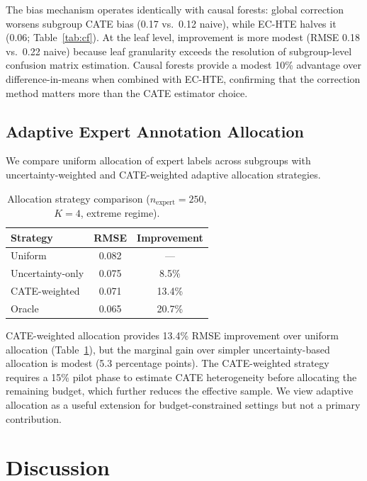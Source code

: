 \documentclass[11pt,a4paper]{article}
\begin{document}
The bias mechanism operates identically with causal forests: global correction worsens subgroup CATE bias (0.17 vs.\ 0.12 naive), while EC-HTE halves it (0.06; Table~\ref{tab:cf}).
At the leaf level, improvement is more modest (RMSE 0.18 vs.\ 0.22 naive) because leaf granularity exceeds the resolution of subgroup-level confusion matrix estimation.
Causal forests provide a modest 10\% advantage over difference-in-means when combined with EC-HTE, confirming that the correction method matters more than the CATE estimator choice.

\subsection{Adaptive Expert Annotation Allocation}
\label{sec:adaptive}

We compare uniform allocation of expert labels across subgroups with uncertainty-weighted and CATE-weighted adaptive allocation strategies.

\begin{table}[t]
\centering
\small
\caption{Allocation strategy comparison ($n_{\text{expert}}=250$, $K=4$, extreme regime).}
\label{tab:allocation}
\begin{tabular}{lcc}
\toprule
Strategy & RMSE & Improvement \\
\midrule
Uniform & 0.082 & --- \\
Uncertainty-only & 0.075 & 8.5\% \\
CATE-weighted & 0.071 & 13.4\% \\
Oracle & 0.065 & 20.7\% \\
\bottomrule
\end{tabular}
\end{table}

CATE-weighted allocation provides 13.4\% RMSE improvement over uniform allocation (Table~\ref{tab:allocation}), but the marginal gain over simpler uncertainty-based allocation is modest (5.3 percentage points).
The CATE-weighted strategy requires a 15\% pilot phase to estimate CATE heterogeneity before allocating the remaining budget, which further reduces the effective sample.
We view adaptive allocation as a useful extension for budget-constrained settings but not a primary contribution.

\section{Discussion}
\end{document}
